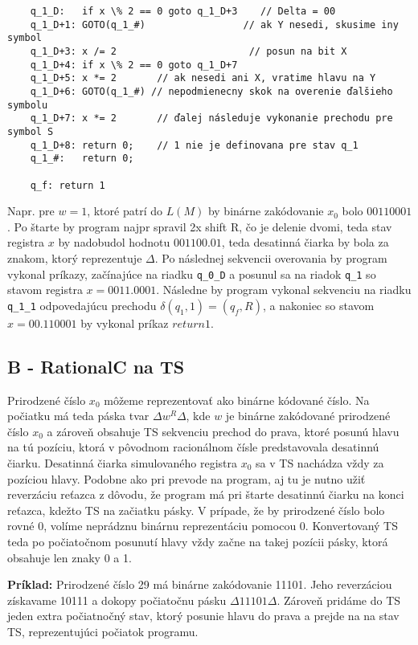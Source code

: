 \documentclass[10pt]{article}
\begin{document}
\begin{verbatim}
    q_1_D:   if x \% 2 == 0 goto q_1_D+3    // Delta = 00
    q_1_D+1: GOTO(q_1_#)                 // ak Y nesedi, skusime iny symbol 
    q_1_D+3: x /= 2                       // posun na bit X
    q_1_D+4: if x \% 2 == 0 goto q_1_D+7 
    q_1_D+5: x *= 2       // ak nesedi ani X, vratime hlavu na Y
    q_1_D+6: GOTO(q_1_#) // nepodmienecny skok na overenie ďalšieho symbolu
    q_1_D+7: x *= 2       // ďalej následuje vykonanie prechodu pre symbol S
    q_1_D+8: return 0;    // 1 nie je definovana pre stav q_1
    q_1_#:   return 0;

    q_f: return 1
    \end{verbatim}
    \normalsize

    Napr. pre $w = 1$, ktoré patrí do $L(M)$ by binárne zakódovanie $x_0$ bolo $00 11 00 01$.
    Po štarte by program najpr spravil 2x shift R, čo je delenie dvomi, teda stav registra $x$
    by nadobudol hodnotu $001100.01$, teda desatinná čiarka by bola za znakom, ktorý reprezentuje
    $\Delta$. Po následnej sekvencii overovania by program vykonal príkazy, začínajúce na riadku
    \texttt{q\_0\_D} a posunul sa na riadok \texttt{q\_1} so stavom registra $x = 00 11.0001$. Následne by program
    vykonal sekvenciu na riadku \texttt{q\_1\_1} odpovedajúcu prechodu $\delta(q_1, 1) = (q_f, R)$,
    a nakoniec so stavom $x = 00.110001$ by vykonal príkaz $return 1$.
    

\subsection*{B - RationalC na TS}

Prirodzené číslo $x_0$ môžeme reprezentovať ako binárne kódované číslo. Na počiatku má teda páska
tvar $\Delta w^R \Delta$, kde $w$ je binárne zakódované prirodzené číslo $x_0$ a zároveň obsahuje TS sekvenciu
prechod do prava, ktoré posunú hlavu na tú pozíciu, ktorá v pôvodnom racionálnom čísle
predstavovala desatinnú čiarku. Desatinná čiarka simulovaného registra $x_0$ sa v TS nachádza vždy
za pozíciou hlavy.
Podobne ako pri prevode na program, aj tu je nutno užiť reverzáciu reťazca z dôvodu, že program má
pri štarte desatinnú čiarku na konci reťazca, kdežto TS na začiatku pásky.
V prípade, že by prirodzené číslo bolo rovné 0, volíme neprádznu binárnu reprezentáciu pomocou 0.
Konvertovaný TS teda po počiatočnom posunutí hlavy vždy začne na takej pozícii pásky, ktorá obsahuje
len znaky 0 a 1.

\textbf{Príklad:}
Prirodzené číslo 29 má binárne zakódovanie 11101. Jeho reverzáciou získavame 10111 a dokopy
počiatočnu pásku $\Delta 11101 \Delta$. 
Zároveň pridáme do TS jeden extra počiatnočný stav, ktorý posunie hlavu do prava a prejde na
na stav TS, reprezentujúci počiatok programu.
\end{document}
